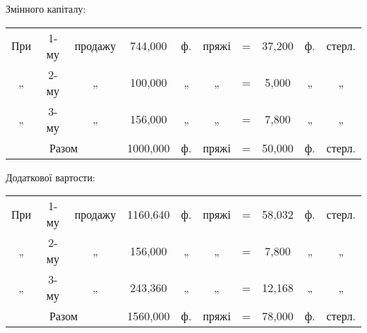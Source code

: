 Змінного капіталу:

\begin{table}[h]
  \setlength{\tabcolsep}{2pt}
  \begin{tabularx}{\textwidth}{c c c c c c c c c c}
    При & 1-му & продажу & 744,000 & ф. & пряжі & = & 37,200 & ф. & стерл.\\
    „ & 2-му & „ & 100,000 & „ & „ & = & 5,000 & „ & „\\
    „ & 3-му & „ & 156,000 & „ & „ & = & 7,800 & „ & „\\
    \cmidrule{1-10}

  \multicolumn{3}{c}{Разом} & 1000,000 & ф. & пряжі & = & 50,000 & ф. & стерл.\\
\end{tabularx}
\end{table}

Додаткової вартости:

\begin{table}[h]
  \setlength{\tabcolsep}{2pt}
  \begin{tabularx}{\textwidth}{c c c c c c c c c c}
    При & 1-му & продажу & 1160,640 & ф. & пряжі & = & 58,032 & ф. & стерл.\\
    „ & 2-му & „ & 156,000 & „ & „ & = & 7,800 & „ & „\\
    „ & 3-му & „ & 243,360 & „ & „ & = & 12,168 & „ & „\\
    \cmidrule{1-10}
    \multicolumn{3}{c}{Разом} & 1560,000 & ф. & пряжі & = & 78,000 & ф. & стерл.\\
  \end{tabularx}
\end{table}
\parbreak{}  %
